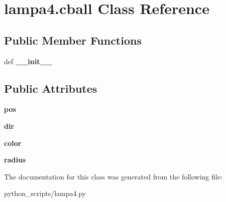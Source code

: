 \hypertarget{classlampa4_1_1cball}{}\section{lampa4.\+cball Class Reference}
\label{classlampa4_1_1cball}
\subsection*{Public Member Functions}
\begin{DoxyCompactItemize}
\item 
\hypertarget{classlampa4_1_1cball_a95e7de64434c4aba7d6a17060d3a276c}{}def {\bfseries \+\_\+\+\_\+init\+\_\+\+\_\+}\label{classlampa4_1_1cball_a95e7de64434c4aba7d6a17060d3a276c}

\end{DoxyCompactItemize}
\subsection*{Public Attributes}
\begin{DoxyCompactItemize}
\item 
\hypertarget{classlampa4_1_1cball_af268dd90a6c7d1d8175d9ce391af9303}{}{\bfseries pos}\label{classlampa4_1_1cball_af268dd90a6c7d1d8175d9ce391af9303}

\item 
\hypertarget{classlampa4_1_1cball_ab65c346ab6d4871e7776f26ee7ce072a}{}{\bfseries dir}\label{classlampa4_1_1cball_ab65c346ab6d4871e7776f26ee7ce072a}

\item 
\hypertarget{classlampa4_1_1cball_a0cdb91e2a6093e469aad7fb6876c3806}{}{\bfseries color}\label{classlampa4_1_1cball_a0cdb91e2a6093e469aad7fb6876c3806}

\item 
\hypertarget{classlampa4_1_1cball_a7bbf2f00f17d07a52b090055433c720a}{}{\bfseries radius}\label{classlampa4_1_1cball_a7bbf2f00f17d07a52b090055433c720a}

\end{DoxyCompactItemize}


The documentation for this class was generated from the following file\+:\begin{DoxyCompactItemize}
\item 
python\+\_\+scripts/lampa4.\+py\end{DoxyCompactItemize}
